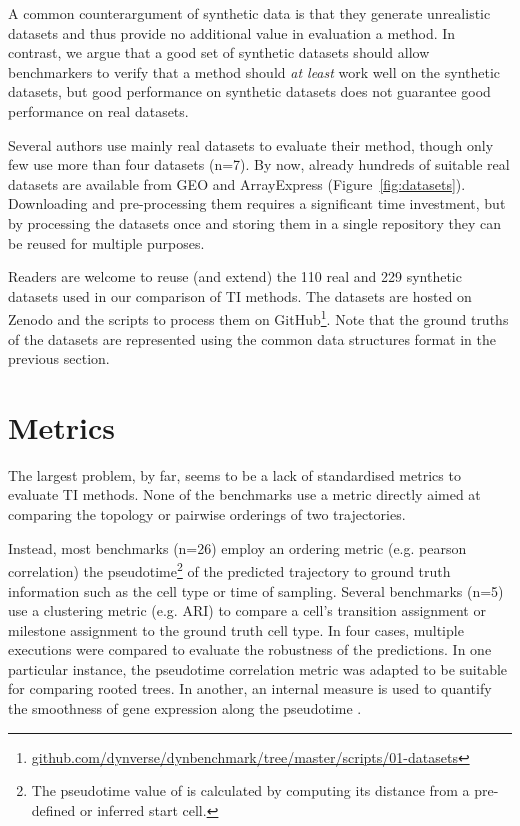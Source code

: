 A common counterargument of synthetic data is that they generate unrealistic datasets and thus provide no additional value in evaluation a method. In contrast, we argue that a good set of synthetic datasets should allow benchmarkers to verify that a method should \textit{at least} work well on the synthetic datasets, but good performance on synthetic datasets does not guarantee good performance on real datasets.

Several authors use mainly real datasets to evaluate their method, though only few use more than four datasets (n=7). 
By now, already hundreds of suitable real datasets are available from GEO and ArrayExpress (Figure~\ref{fig:datasets}). Downloading and pre-processing them requires a significant time investment, but by processing the datasets once and storing them in a single repository they can be reused for multiple purposes.

Readers are welcome to reuse (and extend) the 110 real and 229 synthetic datasets used in our comparison of TI methods\cite{saelens_comparisonsinglecelltrajectory_2019}. The datasets are hosted on Zenodo\cite{cannoodt_singlecellomicsdatasets_2018} and the scripts to process them on GitHub\footnote{\href{https://github.com/dynverse/dynbenchmark/tree/master/scripts/01-datasets}{github.com/dynverse/dynbenchmark/tree/master/scripts/01-datasets}}. Note that the ground truths of the datasets are represented using the common data structures format in the previous section.



\section{Metrics}
The largest problem, by far, seems to be a lack of standardised metrics to evaluate TI methods. None of the benchmarks use a metric directly aimed at comparing the topology or pairwise orderings of two trajectories. 

Instead, most benchmarks (n=26) employ an ordering metric (e.g. pearson correlation) the pseudotime\footnote{The pseudotime value of is calculated by computing its distance from a pre-defined or inferred start cell.} of the predicted trajectory to ground truth information such as the cell type or time of sampling. Several benchmarks (n=5) use a clustering metric (e.g. ARI) to compare a cell's transition assignment or milestone assignment to the ground truth cell type. In four cases, multiple executions were compared to evaluate the robustness of the predictions.
In one particular instance, the pseudotime correlation metric was adapted to be suitable for comparing rooted trees\cite{street_slingshotcelllineage_2018}. In another, an internal measure is used to quantify the smoothness of gene expression along the pseudotime \cite{darocha_reconstructioncomplexsinglecell_2018}.

